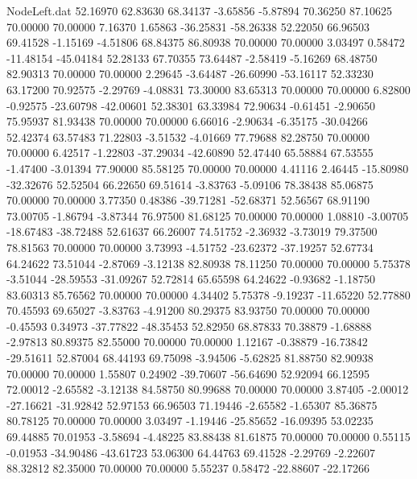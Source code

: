 \begin{filecontents}{NodeLeft.dat}
  52.16970   62.83630   68.34137    -3.65856   -5.87894   70.36250   87.10625   70.00000   70.00000    7.16370    1.65863  -36.25831  -58.26338
  52.22050   66.96503   69.41528    -1.15169   -4.51806   68.84375   86.80938   70.00000   70.00000    3.03497    0.58472  -11.48154  -45.04184
  52.28133   67.70355   73.64487    -2.58419   -5.16269   68.48750   82.90313   70.00000   70.00000    2.29645   -3.64487  -26.60990  -53.16117
  52.33230   63.17200   70.92575    -2.29769   -4.08831   73.30000   83.65313   70.00000   70.00000    6.82800   -0.92575  -23.60798  -42.00601
  52.38301   63.33984   72.90634    -0.61451   -2.90650   75.95937   81.93438   70.00000   70.00000    6.66016   -2.90634   -6.35175  -30.04266
  52.42374   63.57483   71.22803    -3.51532   -4.01669   77.79688   82.28750   70.00000   70.00000    6.42517   -1.22803  -37.29034  -42.60890
  52.47440   65.58884   67.53555    -1.47400   -3.01394   77.90000   85.58125   70.00000   70.00000    4.41116    2.46445  -15.80980  -32.32676
  52.52504   66.22650   69.51614    -3.83763   -5.09106   78.38438   85.06875   70.00000   70.00000    3.77350    0.48386  -39.71281  -52.68371
  52.56567   68.91190   73.00705    -1.86794   -3.87344   76.97500   81.68125   70.00000   70.00000    1.08810   -3.00705  -18.67483  -38.72488
  52.61637   66.26007   74.51752    -2.36932   -3.73019   79.37500   78.81563   70.00000   70.00000    3.73993   -4.51752  -23.62372  -37.19257
  52.67734   64.24622   73.51044    -2.87069   -3.12138   82.80938   78.11250   70.00000   70.00000    5.75378   -3.51044  -28.59553  -31.09267
  52.72814   65.65598   64.24622    -0.93682   -1.18750   83.60313   85.76562   70.00000   70.00000    4.34402    5.75378   -9.19237  -11.65220
  52.77880   70.45593   69.65027    -3.83763   -4.91200   80.29375   83.93750   70.00000   70.00000   -0.45593    0.34973  -37.77822  -48.35453
  52.82950   68.87833   70.38879    -1.68888   -2.97813   80.89375   82.55000   70.00000   70.00000    1.12167   -0.38879  -16.73842  -29.51611
  52.87004   68.44193   69.75098    -3.94506   -5.62825   81.88750   82.90938   70.00000   70.00000    1.55807    0.24902  -39.70607  -56.64690
  52.92094   66.12595   72.00012    -2.65582   -3.12138   84.58750   80.99688   70.00000   70.00000    3.87405   -2.00012  -27.16621  -31.92842
  52.97153   66.96503   71.19446    -2.65582   -1.65307   85.36875   80.78125   70.00000   70.00000    3.03497   -1.19446  -25.85652  -16.09395
  53.02235   69.44885   70.01953    -3.58694   -4.48225   83.88438   81.61875   70.00000   70.00000    0.55115   -0.01953  -34.90486  -43.61723
  53.06300   64.44763   69.41528    -2.29769   -2.22607   88.32812   82.35000   70.00000   70.00000    5.55237    0.58472  -22.88607  -22.17266

\end{filecontents}
